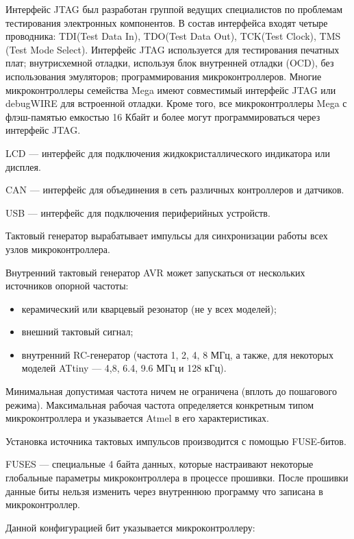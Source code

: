 \documentclass[12pt, oneside]{altsu-report}
\begin{document}
Интерфейс JTAG был разработан группой ведущих специалистов по проблемам тестирования электронных компонентов. В состав интерфейса входят четыре проводника: TDI(Test Data In), TDO(Test Data Out), TCK(Test Clock), TMS (Test Mode Select). Интерфейс JTAG используется для тестирования печатных плат; внутрисхемной отладки, используя блок внутренней отладки (OCD), без использования эмуляторов; программирования микроконтроллеров. Многие микроконтроллеры семейства Mega имеют совместимый интерфейс JTAG или debugWIRE для встроенной отладки. Кроме того, все микроконтроллеры Mega с флэш-памятью емкостью 16 Кбайт и более могут программироваться через интерфейс JTAG.

LCD --- интерфейс для подключения жидкокристаллического индикатора или дисплея.

CAN --- интерфейс для объединения в сеть различных контроллеров и датчиков.

USB --- интерфейс для подключения периферийных устройств.

Тактовый генератор вырабатывает импульсы для синхронизации работы всех узлов микроконтроллера.

Внутренний тактовый генератор AVR может запускаться от нескольких источников опорной частоты:

\begin{itemize}
    \item керамический или кварцевый резонатор (не у всех моделей);

    \item внешний тактовый сигнал;

    \item внутренний RC-генератор (частота 1, 2, 4, 8 МГц, а также, для некоторых моделей ATtiny — 4,8, 6.4, 9.6 МГц и 128 кГц).
\end{itemize}

Минимальная допустимая частота ничем не ограничена (вплоть до пошагового режима). Максимальная рабочая частота определяется конкретным типом микроконтроллера и указывается Atmel в его характеристиках.

Установка источника тактовых импульсов производится с помощью FUSE-битов.

FUSES --- специальные 4 байта данных, которые настраивают некоторые глобальные параметры микроконтроллера в процессе прошивки. После прошивки данные биты нельзя изменить через внутреннюю программу что записана в микроконтроллер.~\cite{AVR}

Данной конфигурацией бит указывается микроконтроллеру:
\end{document}
